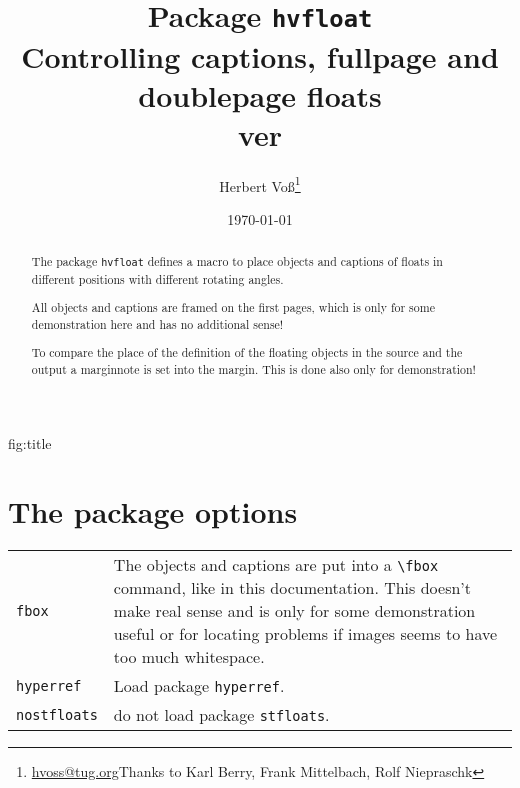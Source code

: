 \documentclass[twoside,paper=a4,usegeometry,index=totoc]{scrartcl}
\makeatletter
\def\Lcs#1{\texttt{\textbackslash#1}\index{#1@\texttt{\textbackslash#1}}}
\def\Lpack#1{\texttt{#1}\index{#1@\texttt{#1} (package)}}
\def\Loption#1{\texttt{#1}\index{#1@\texttt{#1} (package option)}}
\makeatother
\begin{document}
\title{Package \texttt{hvfloat}\\
Controlling captions, fullpage and doublepage floats\\ver \hvFloatFileVersion}
\author{Herbert Voß\thanks{\protect\url{hvoss@tug.org}\newline Thanks to Karl Berry, Frank Mittelbach, Rolf Niepraschk}}
\date{\today}
\maketitle



\begin{abstract}
The package \texttt{hvfloat} defines a macro to place objects and captions of floats in different 
positions with different rotating angles.

All objects and captions are framed on the first pages, which is only for some demonstration here and 
has no additional sense!

To compare the place of the definition of the floating objects in the source and the output a
marginnote  is set into the margin. This is done also only for demonstration!
\end{abstract}
\vfill

  {\protect{}}
  {fig:title}

\vspace*{\fill}

\clearpage


\tableofcontents

\clearpage

\listoftables
\listoffigures


\clearpage
\section{The package options}

\noindent\begin{tabularx}{\textwidth}{lX}
\Loption{fbox} & The objects and captions are put into a \Lcs{fbox} command, like in 
this documentation. This doesn't make real sense and is only for some demonstration useful or for locating
problems if images seems to have too much whitespace.\\
\Loption{hyperref} & Load package \Lpack{hyperref}.\\
\Loption{nostfloats} & do not load package \Lpack{stfloats}.  
\end{tabularx}
\end{document}
